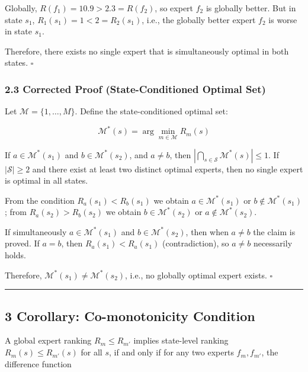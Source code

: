 \documentclass[
  12pt,
]{ctexart}
\begin{document}
Globally, \(R(f_1) = 10.9 > 2.3 = R(f_2)\), so expert \(f_2\) is globally better. But in state
\(s_1\), \(R_1(s_1) = 1 < 2 = R_2(s_1)\), i.e., the globally better expert \(f_2\)
is worse in state \(s_1\).

Therefore, there exists no single expert that is simultaneously optimal in both states. \(\square\)

\subsubsection{2.3 Corrected Proof (State-Conditioned Optimal Set)}\label{corrected-proof-state-conditioned-optimal-set}

Let \(\mathcal{M} = \{1,\dots,M\}\). Define the state-conditioned optimal set:

\[\mathcal{M}^*(s) = \arg\min_{m \in \mathcal{M}} R_m(s)\]

If \(a \in \mathcal{M}^*(s_1)\) and \(b \in \mathcal{M}^*(s_2)\), and
\(a \neq b\), then
\(|\bigcap_{s \in \mathcal{S}} \mathcal{M}^*(s)| \leq 1\). If
\(|\mathcal{S}| \geq 2\)
and there exist at least two distinct optimal experts, then no single expert is optimal in all states.

From the condition \(R_a(s_1) < R_b(s_1)\) we obtain \(a \in \mathcal{M}^*(s_1)\) or
\(b \notin \mathcal{M}^*(s_1)\); from \(R_a(s_2) > R_b(s_2)\) we obtain
\(b \in \mathcal{M}^*(s_2)\) or \(a \notin \mathcal{M}^*(s_2)\).

If simultaneously \(a \in \mathcal{M}^*(s_1)\) and
\(b \in \mathcal{M}^*(s_2)\), then when \(a \neq b\) the claim is proved. If \(a = b\), then
\(R_a(s_1) < R_a(s_1)\) (contradiction), so \(a \neq b\) necessarily holds.

Therefore, \(\mathcal{M}^*(s_1) \neq \mathcal{M}^*(s_2)\), i.e., no globally optimal expert exists. \(\square\)

\begin{center}\rule{0.5\linewidth}{0.5pt}\end{center}

\subsection{3 Corollary: Co-monotonicity
Condition}\label{corollary-co-monotonicity-condition}

A global expert ranking \(R_m \leq R_{m'}\) implies state-level ranking
\(R_m(s) \leq R_{m'}(s)\) for all \(s\), if and only if for any two experts
\(f_m, f_{m'}\), the difference function
\end{document}
